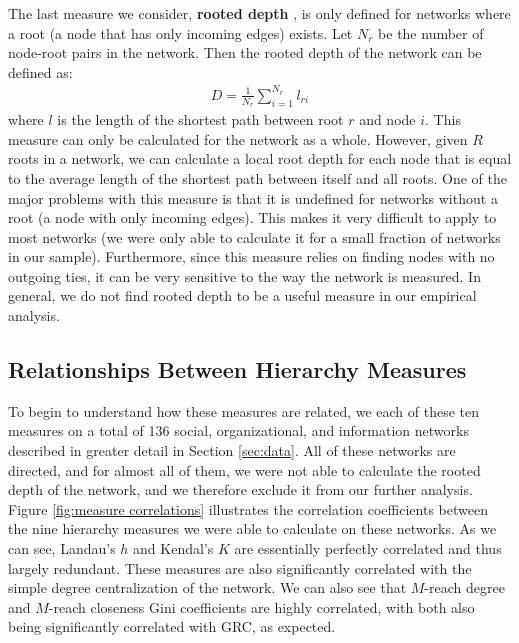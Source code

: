 \documentclass[3p,times]{elsarticle}
\begin{document}
The last measure we consider, \textbf{rooted depth} \cite{Suchecki2013a},  is only defined for networks where a root (a node that has only incoming edges) exists. Let $N_{r}$ be the number of node-root pairs in the network. Then the rooted depth of the network can be defined as:
\begin{align}
	D=\frac{1}{N_{r}}\sum_{i=1}^{N_r}{l_{ri}}
\end{align}
where $l$ is the length of the shortest path between root $r$ and node $i$. This measure can only be calculated for the network as a whole. However, given $R$ roots in a network, we can calculate a local root depth for each node that is equal to the average length of the shortest path between itself and all roots. One of the major problems with this measure is that it is undefined for networks without a root (a node with only incoming edges). This makes it very difficult to apply to most networks (we were only able to calculate it for a small fraction of networks in our sample). Furthermore, since this measure relies on finding nodes with no outgoing ties, it can be very sensitive to the way the network is measured. In general, we do not find rooted depth to be a useful measure in our empirical analysis.

\subsection{Relationships Between Hierarchy Measures}
To begin to understand how these measures are related, we each of these ten measures on a total of 136 social, organizational, and information networks described in greater detail in Section \ref{sec:data}. All of these networks are directed, and for almost all of them, we were not able to calculate the rooted depth of the network, and we therefore exclude it from our further analysis. Figure \ref{fig:measure correlations} illustrates the correlation coefficients between the nine hierarchy measures we were able to calculate on these networks. As we can see,  Landau's $h$ and Kendal's $K$ are essentially perfectly correlated and thus largely redundant. These measures are also significantly correlated with the simple degree centralization of the network. We can also see that $M$-reach degree and $M$-reach closeness Gini coefficients are highly correlated, with both also being significantly correlated with GRC, as expected.
\end{document}
